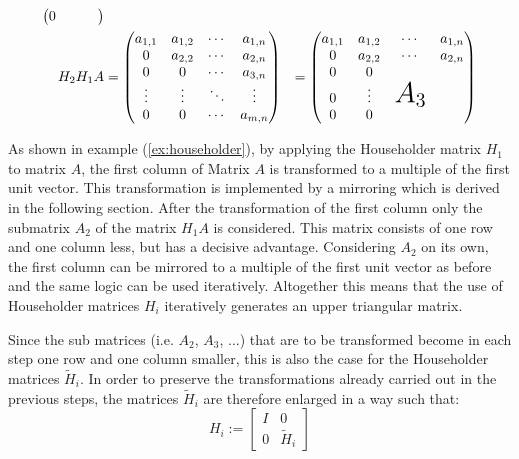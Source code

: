\begin{example}
\begin{subequations}
\begin{align*}
\begin{pmatrix}
		0		& 		  &  	   & 
		\end{pmatrix}\\
		H_2 H_1 A &= 
		\begin{pmatrix}
		a_{1,1} & a_{1,2} & \cdots & a_{1,n} \\
		0		& a_{2,2} & \cdots & a_{2,n} \\
		0		& 0		  & \cdots & a_{3,n} \\
		\vdots  & \vdots  & \ddots & \vdots  \\
		0		& 0		  & \cdots & a_{m,n} 
		\end{pmatrix}
		&= 
		\begin{pmatrix}
		a_{1,1} & a_{1,2} & \cdots & a_{1,n} \\
		0 		& a_{2,2} &	\cdots & a_{2,n} \\
		0 		& 0		  &		   &  \\
		0  		& \vdots  & \text{\huge$A_3$} &   \\
		0		& 0		  &  	   & 
		\end{pmatrix}
		\end{align*}
	\end{subequations}
\end{example}

As shown in example (\ref{ex:householder}), by applying the Householder matrix $H_1$ to matrix $A$, the first column of Matrix $A$ is transformed to a multiple of the first unit vector. This transformation is implemented by a mirroring which is derived in the following section. After the transformation of the first column only the submatrix $A_2$ of the matrix $H_1A$ is considered. This matrix consists of one row and one column less, but has a decisive advantage. Considering $A_2$ on its own, the first column can be mirrored to a multiple of the first unit vector as before and the same logic can be used iteratively. Altogether this means that the use of Householder matrices $H_i$ iteratively generates an upper triangular matrix.

\begin{remark}
	Since the sub matrices (i.e. $A_2$, $A_3$, ...) that are to be transformed become in each step one row and one column smaller, this is also the case for the Householder matrices $\tilde{H}_i$. In order to preserve the transformations already carried out in the previous steps, the matrices $\tilde{H}_i$ are therefore enlarged in a way such that:
	\begin{equation*}
		H_i := \left[
		\begin{array}{cc}
		I & 0 \\
		0 & \tilde{H}_i
		\end{array}
		\right]
	\end{equation*}
\end{remark}

